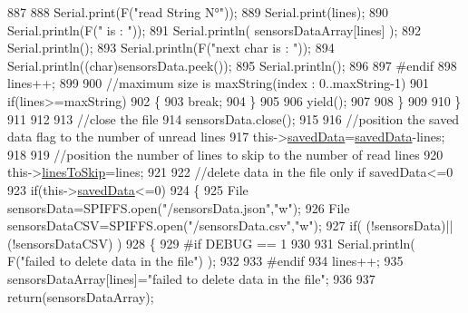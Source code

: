 \begin{DoxyCode}
887      
888                 Serial.print(F(\textcolor{stringliteral}{"read String N°"}));
889                 Serial.print(lines);
890                 Serial.println(F(\textcolor{stringliteral}{" is : "}));
891                 Serial.println( sensorsDataArray[lines] );
892                 Serial.println();
893                 Serial.println(F(\textcolor{stringliteral}{"next char is : "}));
894                 Serial.println((\textcolor{keywordtype}{char})sensorsData.peek());
895                 Serial.println();           
896             
897 \textcolor{preprocessor}{            #endif}
898                 lines++;
899             
900                 \textcolor{comment}{//maximum size is maxString(index : 0..maxString-1)}
901                 \textcolor{keywordflow}{if}(lines>=maxString)
902                 \{
903                     \textcolor{keywordflow}{break};
904                 \}
905             
906                 yield();
907             
908             \}
909 
910         \}
911         
912                     
913         \textcolor{comment}{//close the file}
914         sensorsData.close();
915 
916         \textcolor{comment}{//position the saved data flag to the number of unread lines}
917         this->\hyperlink{class_cool_file_system_ad9f5b739a32100f5f21270c3d9ee2b1d}{savedData}=\hyperlink{class_cool_file_system_ad9f5b739a32100f5f21270c3d9ee2b1d}{savedData}-lines;
918         
919         \textcolor{comment}{//position the number of lines to skip to the number of read lines  }
920         this->\hyperlink{class_cool_file_system_a84fdb6057e534b395512463daa28ea3c}{linesToSkip}=lines;
921 
922         \textcolor{comment}{//delete data in the file only if savedData<=0}
923         \textcolor{keywordflow}{if}(this->\hyperlink{class_cool_file_system_ad9f5b739a32100f5f21270c3d9ee2b1d}{savedData}<=0)
924         \{
925             File sensorsData=SPIFFS.open(\textcolor{stringliteral}{"/sensorsData.json"},\textcolor{stringliteral}{"w"});
926             File sensorsDataCSV=SPIFFS.open(\textcolor{stringliteral}{"/sensorsData.csv"},\textcolor{stringliteral}{"w"});
927             \textcolor{keywordflow}{if}( (!sensorsData)||(!sensorsDataCSV) ) 
928             \{
929 \textcolor{preprocessor}{            #if DEBUG == 1}
930     
931                 Serial.println( F(\textcolor{stringliteral}{"failed to delete data in the file"}) );
932     
933 \textcolor{preprocessor}{            #endif}
934                 lines++;
935                 sensorsDataArray[lines]=\textcolor{stringliteral}{"failed to delete data in the file"};
936 
937                 \textcolor{keywordflow}{return}(sensorsDataArray);

\end{DoxyCode}
